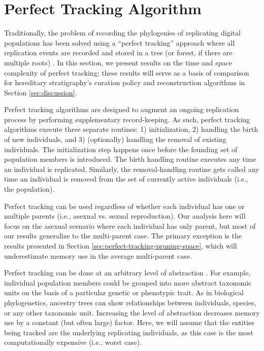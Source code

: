 \section{Perfect Tracking Algorithm} \label{sec:perfect-tracking-algorithm}

Traditionally, the problem of recording the phylogenies of replicating digital populations has been solved using a ``perfect tracking'' approach where all replication events are recorded and stored in a tree (or forest, if there are multiple roots) \citep{dolson2023phylotrackpy}.
In this section, we present results on the time and space complexity of perfect tracking;
these results will serve as a basis of comparison for hereditary stratigraphy's curation policy and reconstruction algorithms in Section \ref{sec:discussion}.

Perfect tracking algorithms are designed to augment an ongoing replication process by performing supplementary record-keeping.
As such, perfect tracking algorithms execute three separate routines: 1) initialization, 2) handling the birth of new individuals, and 3) (optionally) handling the removal of existing individuals.
The initialization step happens once before the founding set of population members is introduced.
The birth handling routine executes any time an individual is replicated.
Similarly, the removal-handling routine gets called any time an individual is removed from the set of currently active individuals (i.e., the population).

Perfect tracking can be used regardless of whether each individual has one or multiple parents (i.e., asexual vs. sexual reproduction).
Our analysis here will focus on the asexual scenario where each individual has only parent, but most of our results generalize to the multi-parent case.
The primary exception is the results presented in Section \ref{sec:perfect-tracking-pruning-space}, which will underestimate memory use in the average multi-parent case.

Perfect tracking can be done at an arbitrary level of abstraction \citep{dolson2020interpreting}.%
For example, individual population members could be grouped into more abstract taxonomic units on the basis of a particular genetic or phenotypic trait.
As in biological phylogenetics, ancestry trees can show relationships between individuals, species, or any other taxonomic unit.
Increasing the level of abstraction decreases memory use by a constant (but often large) factor.
Here, we will assume that the entities being tracked are the underlying replicating individuals, as this case is the most computationally expensive (i.e., worst case).

